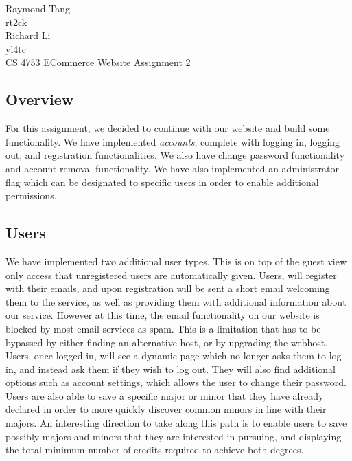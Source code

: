 \documentclass{article}
\begin{document}
\begin{singlespace}
\noindent Raymond Tang\\
rt2ck\\
Richard Li\\
yl4tc\\
CS 4753 ECommerce Website Assignment 2\\
\end{singlespace}

\begin{doublespace}
\subsection*{Overview}
\indent For this assignment, we decided to continue with our website and build some functionality. We have implemented \emph{accounts}, complete with logging in, logging out, and registration functionalities. We also have change password functionality and account removal functionality. We have also implemented an administrator flag which can be designated to specific users in order to enable additional permissions.\\

\subsection*{Users}
\indent We have implemented two additional user types. This is on top of the guest view only access that unregistered users are automatically given. Users, will register with their emails, and upon registration will be sent a short email welcoming them to the service, as well as providing them with additional information about our service. However at this time, the email functionality on our website is blocked by most email services as spam. This is a limitation that has to be bypassed by either finding an alternative host, or by upgrading the webhost.\\
\indent Users, once logged in, will see a dynamic page which no longer asks them to log in, and instead ask them if they wish to log out. They will also find additional options such as account settings, which allows the user to change their password.\\
\indent Users are also able to save a specific major or minor that they have already declared in order to more quickly discover common minors in line with their majors. An interesting direction to take along this path is to enable users to save possibly majors and minors that they are interested in pursuing, and displaying the total minimum number of credits required to achieve both degrees.\\


\end{doublespace}
\end{document}
